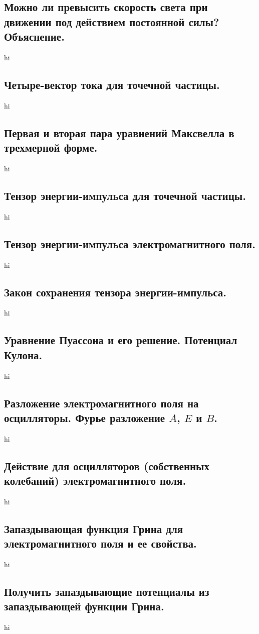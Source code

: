 \documentclass[a4paper,12pt]{article}
\begin{document}
\subsection{Можно ли превысить скорость света при движении под действием
постоянной силы? Объяснение.}
hi
\subsection{Четыре-вектор тока для точечной частицы.}
hi
\subsection{Первая и вторая пара уравнений Максвелла в трехмерной форме.}
hi
\subsection{Тензор энергии-импульса для точечной частицы.}
hi
\subsection{Тензор энергии-импульса электромагнитного поля.}
hi
\subsection{Закон сохранения тензора энергии-импульса.}
hi
\subsection{Уравнение Пуассона и его решение. Потенциал Кулона.}
hi
\subsection{Разложение электромагнитного поля на осцилляторы. Фурье разложение 
$A$, $E$ и $B$.}
hi
\subsection{Действие для осцилляторов (собственных колебаний)
электромагнитного поля.}
hi
\subsection{Запаздывающая функция Грина для электромагнитного поля и ее
свойства.}
hi
\subsection{Получить запаздывающие потенциалы из запаздывающей функции Грина.}
hi
\end{document}
